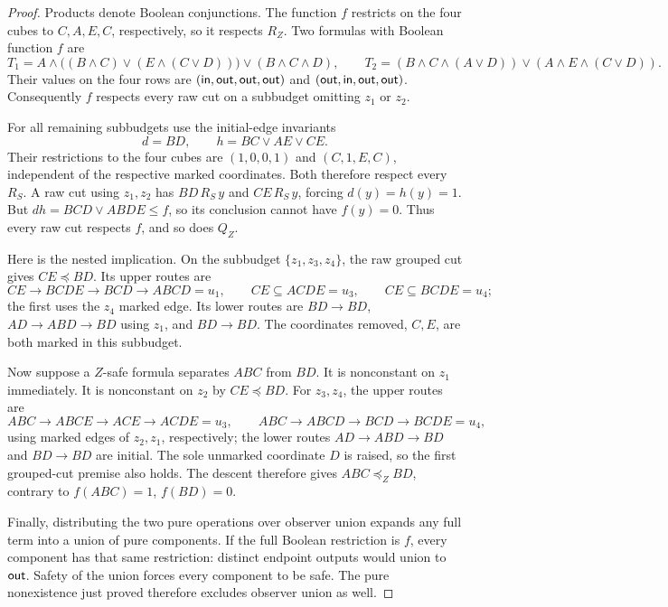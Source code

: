 \begin{proof}
Products denote Boolean conjunctions. The function $f$ restricts on
the four cubes to $C,A,E,C$, respectively, so it respects $R_Z$.
Two formulas with Boolean function $f$ are
\[
 T_1=A\wedge\bigl((B\wedge C)\vee(E\wedge(C\vee D))\bigr)
       \vee(B\wedge C\wedge D),
 \qquad
 T_2=(B\wedge C\wedge(A\vee D))
       \vee(A\wedge E\wedge(C\vee D)).
\]
Their values on the four rows are
$(\mathsf{in},\mathsf{out},\mathsf{out},\mathsf{out})$ and
$(\mathsf{out},\mathsf{in},\mathsf{out},\mathsf{out})$.
Consequently $f$ respects every raw cut on a subbudget omitting
$z_1$ or $z_2$.

For all remaining subbudgets use the initial-edge invariants
\[
 d=BD,\qquad h=BC\vee AE\vee CE.
\]
Their restrictions to the four cubes are $(1,0,0,1)$ and
$(C,1,E,C)$, independent of the respective marked coordinates.
Both therefore respect every $R_S$.
A raw cut using $z_1,z_2$ has $BD\,R_S\,y$ and $CE\,R_S\,y$,
forcing $d(y)=h(y)=1$. But
$dh=BCD\vee ABDE\leq f$, so its conclusion cannot have $f(y)=0$.
Thus every raw cut respects $f$, and so does $Q_Z$.

Here is the nested implication. On the subbudget
$\{z_1,z_3,z_4\}$, the raw grouped cut gives $CE\preceq BD$.
Its upper routes are
\[
 CE\to BCDE\to BCD\to ABCD=u_1,\qquad
 CE\subseteq ACDE=u_3,\qquad CE\subseteq BCDE=u_4;
\]
the first uses the $z_4$ marked edge. Its lower routes are
$BD\to BD$, $AD\to ABD\to BD$ using $z_1$, and $BD\to BD$.
The coordinates removed, $C,E$, are both marked in this subbudget.

Now suppose a $Z$-safe formula separates $ABC$ from $BD$.
It is nonconstant on $z_1$ immediately. It is nonconstant on $z_2$
by $CE\preceq BD$. For $z_3,z_4$, the upper routes are
\[
 ABC\to ABCE\to ACE\to ACDE=u_3,\qquad
 ABC\to ABCD\to BCD\to BCDE=u_4,
\]
using marked edges of $z_2,z_1$, respectively; the lower routes
$AD\to ABD\to BD$ and $BD\to BD$ are initial.
The sole unmarked coordinate $D$ is raised, so the first grouped-cut
premise also holds. The descent therefore gives $ABC\preceq_Z BD$,
contrary to $f(ABC)=1$, $f(BD)=0$.

Finally, distributing the two pure operations over observer union
expands any full term into a union of pure components. If the full
Boolean restriction is $f$, every component has that same restriction:
distinct endpoint outputs would union to $\mathsf{out}$.
Safety of the union forces every component to be safe. The pure
nonexistence just proved therefore excludes observer union as well.
\end{proof}

